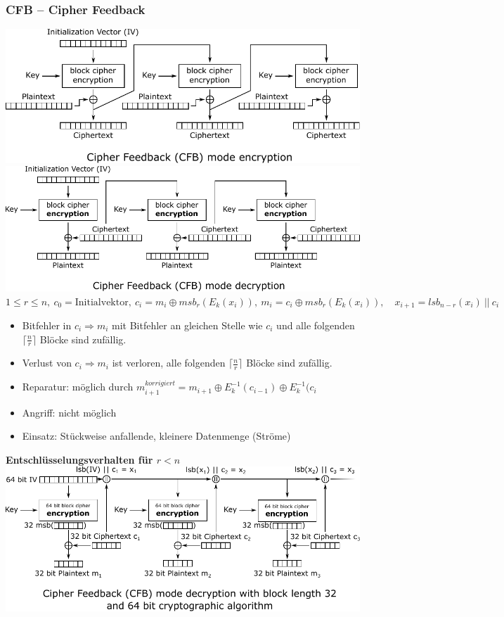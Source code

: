 \documentclass[8pt,a4paper,landscape]{article}
\begin{document}
\begin{multicols}{4}
\subsubsection{CFB – Cipher Feedback}
\includegraphics[width=\columnwidth]{CFB_encryption.pdf}
\includegraphics[width=\columnwidth]{CFB_decryption.pdf}
\(1 \leq r \leq n,~c_0 = \textrm{Initialvektor},~c_i = m_i \oplus msb_{r}(E_k(x_{i})),~m_i = c_i \oplus msb_{r}(E_k(x_{i})), \quad x_{i+1} = lsb_{n-r}(x_{i})~||~c_i\)
\begin{itemize}[itemsep=1pt]
\item Bitfehler in \(c_i \Rightarrow m_i \) mit Bitfehler an gleichen Stelle wie \(c_i\) und alle folgenden $\lceil\frac{n}{r}\rceil$ Blöcke sind zufällig. 
\item Verlust von \(c_i \Rightarrow m_i \) ist verloren, alle folgenden $\lceil\frac{n}{r}\rceil$ Blöcke sind zufällig. 
\item Reparatur: möglich durch $m_{i+1}^{korrigiert} = m_{i+1} \oplus E_k^{-1}(c_{i-1}) \oplus E_k^{-1}(c_{i}$
\item Angriff: nicht möglich
\item Einsatz: Stückweise anfallende, kleinere Datenmenge (Ströme)
\end{itemize}
\textbf{Entschlüsselungsverhalten für $r<n$}\\
\includegraphics[width=\columnwidth]{CFB32_decryption.pdf}


\end{multicols}
\end{document}
